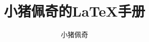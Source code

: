 \documentclass[12pt,a4paper]{article}
\title{小猪佩奇的\LaTeX 手册}
\author{小猪佩奇}
\newcommand{\clearpagestyle}[0]{\thispagestyle{empty}}
\begin{document}
\large

\begin{titlepage}
    \maketitle\clearpagestyle
    \newpage{}\tableofcontents
    \newpage{}
\end{titlepage}




\end{document}
